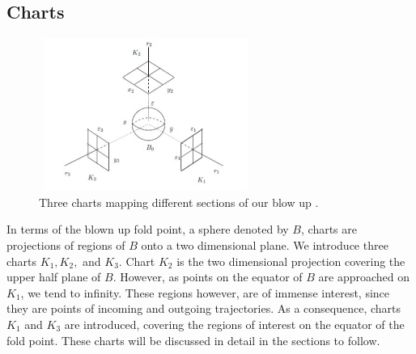 \subsection{Charts} 
\begin{figure}[h!]
	\centering
	\includegraphics[height=5cm,width=7cm]{Images/charts-ball}
	\caption{Three charts mapping different sections of our blow up \citep{krupa2001}.}
\end{figure}
In terms of the blown up fold point, a sphere denoted by $B$, charts are projections of regions of $B$ onto a two dimensional plane. 
We introduce three charts $ K_1,K_2,$ and $K_3 $. Chart $K_2$ is the two dimensional projection covering the upper half plane of $B$. However, as points on the equator of $B$ are approached on $K_1$, we tend to infinity.
These regions however, are of immense interest, since they are points of incoming and outgoing trajectories. As a consequence, charts $K_1$ and $K_3$ are introduced, covering the regions of interest on the equator of the fold point. These charts will be discussed in detail in the sections to follow.


